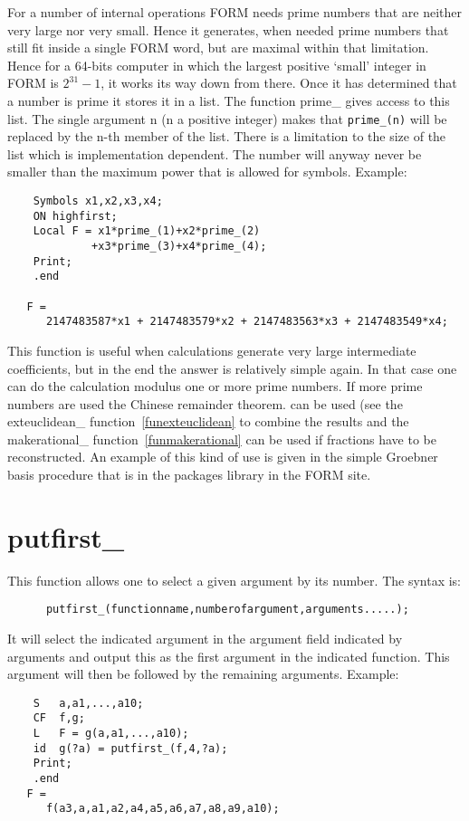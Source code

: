 \noindent For a number of internal operations FORM needs prime numbers that 
are neither very large nor very small. Hence it generates, when needed 
prime numbers that still fit inside a single FORM word, but are maximal 
within that limitation. Hence for a 64-bits computer in which the largest 
positive `small' integer in FORM is $2^{31}-1$, it works its way down from 
there. Once it has determined that a number is prime it stores it in a 
list. The function prime\_ gives access to this list. The single argument 
n (n a positive integer) makes that \verb:prime_(n): will be replaced by 
the n-th member of the list. There is a limitation to the size of the list 
which is implementation dependent. The number will anyway never be smaller 
than the maximum power that is allowed for symbols. Example:
\begin{verbatim}
    Symbols x1,x2,x3,x4;
    ON highfirst;
    Local F = x1*prime_(1)+x2*prime_(2)
             +x3*prime_(3)+x4*prime_(4);
    Print;
    .end

   F =
      2147483587*x1 + 2147483579*x2 + 2147483563*x3 + 2147483549*x4;
\end{verbatim}
This function is useful when calculations generate very large intermediate 
coefficients, but in the end the answer is relatively simple again. In that 
case one can do the calculation modulus one or more prime numbers. If more 
prime numbers are used the Chinese remainder theorem. can be used (see the exteuclidean\_ 
function~\ref{funexteuclidean} to combine the results and the 
makerational\_ function~\ref{funmakerational} can be used if fractions have 
to be reconstructed. An example of this kind of use is given in the simple 
Groebner basis procedure that is in the packages library in the FORM site.


\section{putfirst\_}
\label{funputfirst}

\noindent 
This function allows one to select a given argument by its number. The 
syntax is:
\begin{verbatim}
      putfirst_(functionname,numberofargument,arguments.....);
\end{verbatim}
It will select the indicated argument in the argument field indicated by 
arguments and output this as the first argument in the indicated function. 
This argument will then be followed by the remaining arguments.
Example:
\begin{verbatim}
    S   a,a1,...,a10;
    CF  f,g;
    L   F = g(a,a1,...,a10);
    id  g(?a) = putfirst_(f,4,?a);
    Print;
    .end
   F =
      f(a3,a,a1,a2,a4,a5,a6,a7,a8,a9,a10);
\end{verbatim}

